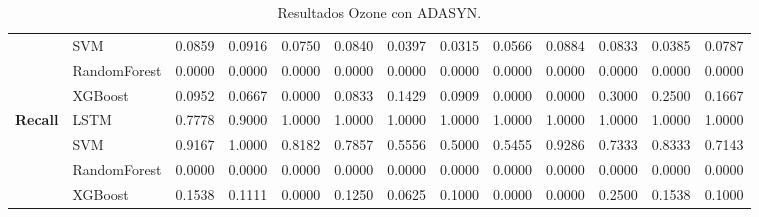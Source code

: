 \begin{table}[h]
\begin{adjustbox}{max width=15cm}
\begin{tabular}{|c|l|r|r|r|r|r|r|r|r|r|r|r|}
			& SVM &  0.0859 &  0.0916 &  0.0750 &  0.0840 &  0.0397 &  0.0315 &  0.0566 &  0.0884 &  0.0833 &  0.0385 &  0.0787 \\
			& RandomForest &  0.0000 &  0.0000 &  0.0000 &  0.0000 &  0.0000 &  0.0000 &  0.0000 &  0.0000 &  0.0000 &  0.0000 &  0.0000 \\
			& XGBoost &  0.0952 &  0.0667 &  0.0000 &  0.0833 &  0.1429 &  0.0909 &  0.0000 &  0.0000 &  0.3000 &  0.2500 &  0.1667 \\
			\hline
			\textbf{Recall} & LSTM &  0.7778 &  0.9000 &  1.0000 &  1.0000 &  1.0000 &  1.0000 &  1.0000 &  1.0000 &  1.0000 &  1.0000 &  1.0000 \\
			& SVM &  0.9167 &  1.0000 &  0.8182 &  0.7857 &  0.5556 &  0.5000 &  0.5455 &  0.9286 &  0.7333 &  0.8333 &  0.7143 \\
			& RandomForest &  0.0000 &  0.0000 &  0.0000 &  0.0000 &  0.0000 &  0.0000 &  0.0000 &  0.0000 &  0.0000 &  0.0000 &  0.0000 \\
			& XGBoost &  0.1538 &  0.1111 &  0.0000 &  0.1250 &  0.0625 &  0.1000 &  0.0000 &  0.0000 &  0.2500 &  0.1538 &  0.1000 \\
			\hline
		\end{tabular}
	\end{adjustbox}
	\caption{Resultados Ozone con ADASYN.}
	\label{tab:Ozone_ADASYN}
\end{table}


